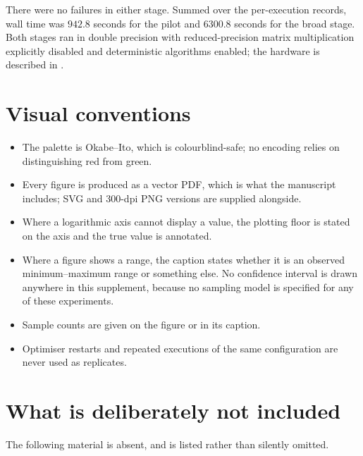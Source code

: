 \documentclass[11pt]{amsart}
\begin{document}
There were no failures in either stage. Summed over the per-execution records, wall time was
$942.8$ seconds for the pilot and $6300.8$ seconds for the broad stage. Both stages ran in
double precision with reduced-precision matrix multiplication explicitly disabled and
deterministic algorithms enabled; the hardware is described in \cite{ChaveroJassoSoftware}.

\section{Visual conventions}
\label{sec:conventions}

\begin{itemize}[leftmargin=*]
\item The palette is Okabe--Ito, which is colourblind-safe; no encoding relies on
distinguishing red from green.
\item Every figure is produced as a vector PDF, which is what the manuscript includes; SVG
and 300-dpi PNG versions are supplied alongside.
\item Where a logarithmic axis cannot display a value, the plotting floor is stated on the
axis and the true value is annotated.
\item Where a figure shows a range, the caption states whether it is an observed
minimum--maximum range or something else. No confidence interval is drawn anywhere in this
supplement, because no sampling model is specified for any of these experiments.
\item Sample counts are given on the figure or in its caption.
\item Optimiser restarts and repeated executions of the same configuration are never used
as replicates.
\end{itemize}

\section{What is deliberately not included}
\label{sec:notincluded}

The following material is absent, and is listed rather than silently omitted.
\end{document}
